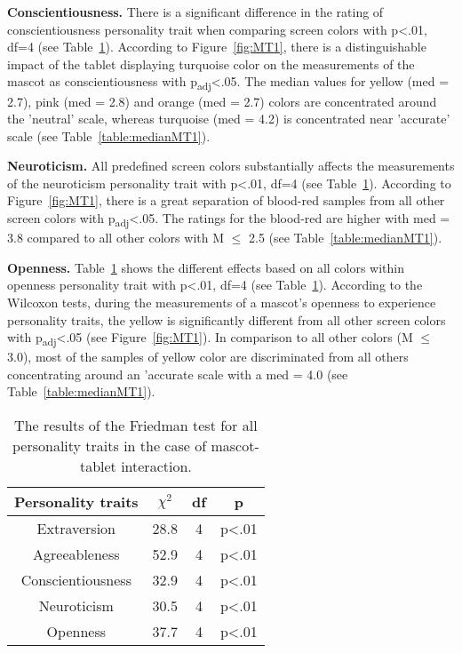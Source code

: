 \par\textbf{Conscientiousness.}
There is a significant difference in the rating of conscientiousness personality trait
when comparing screen colors with p<.01, df=4 (see Table~\ref{table:friedmanMT1}).
According to Figure~\ref{fig:MT1}, there is a distinguishable impact of the
tablet displaying turquoise color on the measurements of the mascot as conscientiousness with p\textsubscript{adj}<.05.
The median values for yellow (med = 2.7), pink (med = 2.8) and orange (med = 2.7) colors are
concentrated around the 'neutral' scale, whereas turquoise (med = 4.2)
is concentrated near 'accurate' scale (see Table~\ref{table:medianMT1}).

\par\textbf{Neuroticism.}
All predefined screen colors substantially affects the measurements of the neuroticism personality
trait with p<.01, df=4 (see Table~\ref{table:friedmanMT1}).
According to Figure~\ref{fig:MT1}, there is a great separation of blood-red
samples from all other screen colors with p\textsubscript{adj}<.05.
The ratings for the blood-red are higher with med = 3.8 compared to all other colors
with M $\leq$ 2.5 (see Table~\ref{table:medianMT1}).

\par\textbf{Openness.}
Table~\ref{table:friedmanMT1} shows the different effects based on all colors within openness
personality trait with p<.01, df=4 (see Table~\ref{table:friedmanMT1}).
According to the Wilcoxon tests, during the measurements of a mascot's openness to experience
personality traits, the yellow is significantly different from all other screen
colors with p\textsubscript{adj}<.05 (see Figure~\ref{fig:MT1}).
In comparison to all other colors (M $\leq$ 3.0), most of the samples of yellow color are discriminated
from all others concentrating around an 'accurate scale with a med = 4.0 (see Table~\ref{table:medianMT1}).

\begin{table}[hbt!]
    \renewcommand{\arraystretch}{1}
    \begin{center}
        \begin{tabular}{|c|c|c|c|}
            \hline
            \textbf{Personality traits} & \textbf{$\chi^2$} & \textbf{df} & \textbf{p} \\
            \hline
            Extraversion &28.8 &4 &p<.01 \\
            Agreeableness &52.9 &4 &p<.01 \\
            Conscientiousness &32.9 &4 &p<.01 \\
            Neuroticism &30.5 &4 &p<.01 \\
            Openness &37.7 &4 &p<.01 \\
            \hline
        \end{tabular}
        \caption{The results of the Friedman test for all personality traits in the case of mascot-tablet interaction.}
        \label{table:friedmanMT1}
    \end{center}
\end{table}


